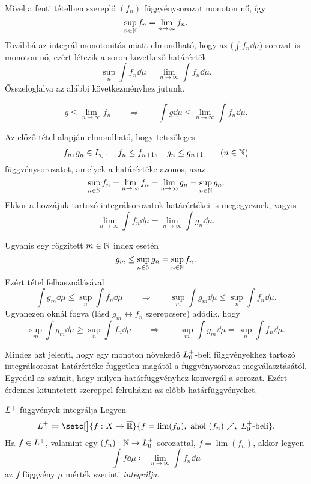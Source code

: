 \documentclass[
]{elteikthesis}[2024/04/26]
\begin{document}
	\newpage
	\begin{note}
		Mivel a fenti tételben szereplő \( (f_n) \) függvénysorozat monoton nő, így
		\[
			\sup_{n \in \mathbb{N}} f_n = \lim_{n \to \infty} f_n.
		\]
		Továbbá az integrál monotonitás miatt elmondható, 
		hogy az \( \bigl( \int f_n \dd{\mu} \bigr) \) sorozat is monoton nő,
		ezért létezik a soron következő határérték
		\[
			\sup_{n} \int f_n \dd{\mu} = 
			\lim_{n \to \infty} \int f_n \dd{\mu}.
		\]
		Összefoglalva az alábbi következményhez jutunk.
		
		\begin{theo*}
			\[
				g \leq \lim_{n \to \infty} f_n
				\qquad \Longrightarrow \qquad
				\int g \dd{\mu} \leq \lim_{n \to \infty} \int f_n \dd{\mu}.
			\]
		\end{theo*}
	\end{note}
	
	Az előző tétel alapján elmondható, hogy tetszőleges
	\[
		f_n, g_n \in \StepFuncPos, \quad f_n \leq f_{n + 1}, \quad g_n \leq g_{n + 1} \qquad (n \in \N)
	\]
	függvénysorozatot, amelyek a határértéke azonos, azaz
	\[
		\sup_{n \in \mathbb{N}} f_n = 
		\lim_{n \to \infty} f_n = 
		\lim_{n \to \infty} g_n = 
		\sup_{n \in \mathbb{N}} g_n.
	\]
	Ekkor a hozzájuk tartozó integrálsorozatok határértékei is megegyeznek, vagyis
	\[
		\lim_{n \to \infty} \int f_n \dd{\mu} = 
		\lim_{n \to \infty} \int g_n \dd{\mu}.
	\]
	\begin{prf*}
		Ugyanis egy rögzített \( m \in \mathbb{N} \) index esetén
		\[
			g_m \leq \sup_{n \in \mathbb{N}} g_n = \sup_{n \in \mathbb{N}} f_n.
		\]
		Ezért  tétel felhasználásával
		\[
			\int g_m \dd{\mu} \leq \sup_{n} \int f_n \dd{\mu}
			\qquad \Longrightarrow \qquad
			\sup_{m} \int g_m \dd{\mu} \leq \sup_{n} \int f_n \dd{\mu}.
		\]
		Ugyanezen oknál fogva (lásd \( g_m \longleftrightarrow f_n \) szerepcsere) adódik, hogy
		\[
			\sup_{m} \int g_m \dd{\mu} \geq \sup_{n} \int f_n \dd{\mu}
			\qquad \Longrightarrow \qquad
			\boxed{\sup_{m} \int g_m \dd{\mu} = \sup_{n} \int f_n \dd{\mu}}.
		\]
	\end{prf*}
	
	\noindent
	Mindez azt jelenti, hogy egy monoton növekedő \( \StepFuncPos \)-beli függvényekhez tartozó 
	integrálsorozat határértéke független magától a függvénysorozat megválasztásától. 
	Egyedül az számít, hogy milyen határfüggvényhez konvergál a sorozat.
	Ezért érdemes kitüntetett szereppel felruházni az előbb határfüggvényeket.
	
	\begin{definition}{\( L^+ \)-függvények integrálja}{}
		Legyen
		\[
			\StepFuncPlus \coloneq
			\setc[\big]{ \func{f}{X}{\overline{\R}} }
			     { f = \lim(f_n), \text{ ahol } (f_n) \nearrow, \ \StepFuncPos \text{-beli}}.
		\]
		Ha \( f \in L^+ \), valamint egy \( \func{(f_n)}{\N}{\StepFuncPos} \) sorozattal,
		\( f = \lim(f_n) \), akkor legyen
		\[
			\int f \dd{\mu} \coloneq 
			\lim_{n \to \infty} \int f_n \dd{\mu}
		\]
		az \( f \) függvény \( \mu \) mérték szerinti \emph{integrálja}.
	\end{definition}
	
\end{document}
